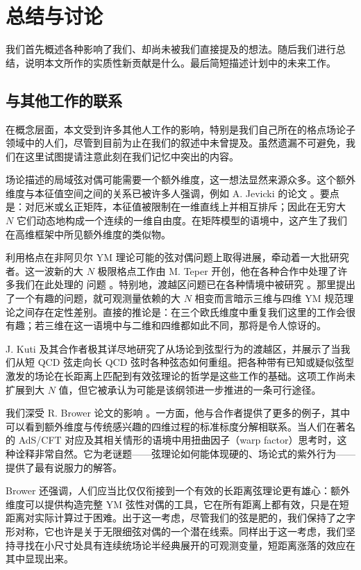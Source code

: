 \section{总结与讨论}

我们首先概述各种影响了我们、却尚未被我们直接提及的想法。随后我们进行总结，说明本文所作的实质性新贡献是什么。最后简短描述计划中的未来工作。

\subsection{与其他工作的联系}

在概念层面，本文受到许多其他人工作的影响，特别是我们自己所在的格点场论子领域中的人们，尽管到目前为止在我们的叙述中未曾提及。虽然遗漏不可避免，我们在这里试图提请注意此刻在我们记忆中突出的内容。

场论描述的局域弦对偶可能需要一个额外维度，这一想法显然来源众多。这个额外维度与本征值空间之间的关系已被许多人强调，例如 A. Jevicki 的论文 \cite{jevi}。要点是：对厄米或幺正矩阵，本征值被限制在一维直线上并相互排斥；因此在无穷大 $N$ 它们动态地构成一个连续的一维自由度。在矩阵模型的语境中，这产生了我们在高维框架中所见额外维度的类似物。

利用格点在非阿贝尔 YM 理论可能的弦对偶问题上取得进展，牵动着一大批研究者。这一波新的大 $N$ 极限格点工作由 M. Teper 开创，他在各种合作中处理了许多我们在此处理的
问题 \cite{teper}。特别地，渡越区问题已在各种情境中被研究 \cite{teper-cross-over}。那里提出了一个有趣的问题，就可观测量依赖的大 $N$ 相变而言暗示三维与四维 YM 规范理论之间存在定性差别。直接的推论是：在三个欧氏维度中重复我们这里的工作会很有趣；若三维在这一语境中与二维和四维都如此不同，那将是令人惊讶的。

J. Kuti \cite{kuti} 及其合作者极其详尽地研究了从场论到弦型行为的渡越区，并展示了当我们从短 QCD 弦走向长 QCD 弦时各种弦态如何重组。把各种带有已知或疑似弦型激发的场论在长距离上匹配到有效弦理论的哲学是这些工作的基础。这项工作尚未扩展到大 $N$ 值，但它被承认为可能是该纲领进一步推进的一条可行途径。

我们深受 R. Brower 论文的影响
\cite{brower}。一方面，他与合作者提供了更多的例子，其中可以看到额外维度与传统感兴趣的四维过程的标准标度分解相联系。当人们在著名的 AdS/CFT 对应及其相关情形的语境中用扭曲因子（warp factor）思考时，这种诠释非常自然。它为老谜题——弦理论如何能体现硬的、场论式的紫外行为——提供了最有说服力的解答。

Brower 还强调，人们应当比仅仅衔接到一个有效的长距离弦理论更有雄心：额外维度可以提供构造完整 YM 弦性对偶的工具，它在所有距离上都有效，只是在短距离对实际计算过于困难。出于这一考虑，尽管我们的弦是肥的，我们保持了之字形对称，它也许是关于无限细弦对偶的一个潜在线索。同样出于这一考虑，我们坚持寻找在小尺寸处具有连续统场论半经典展开的可观测变量，短距离涨落的效应在其中显现出来。

